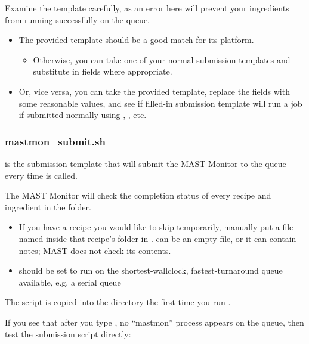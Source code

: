 \documentclass[letterpaper,10pt,english]{sphinxmanual}
\begin{document}
Examine the template carefully, as an error here will prevent your ingredients from running successfully on the queue.
\begin{itemize}
\item {} 
The provided template should be a good match for its platform.
\begin{itemize}
\item {} 
Otherwise, you can take one of your normal submission templates and substitute in  fields where appropriate.

\end{itemize}

\item {} 
Or, vice versa, you can take the provided template, replace the  fields with some reasonable values, and see if filled-in submission template will run a job if submitted normally using , , etc.

\end{itemize}


\subsubsection{mastmon\_submit.sh}
\label{1_0_installation:mastmon-submit-sh}
 is the submission template that will submit the MAST Monitor to the queue every time  is called.

The MAST Monitor will check the completion status of every recipe and ingredient in the  folder.
\begin{itemize}
\item {} 
If you have a recipe you would like to skip temporarily, manually put a file named  inside that recipe's folder in .  can be an empty file, or it can contain notes; MAST does not check its contents.

\item {} 
 should be set to run on the shortest-wallclock, fastest-turnaround queue available, e.g. a serial queue

\end{itemize}

The  script is copied into the  directory the first time you run .

If you see that after you type , no ``mastmon'' process appears on the queue, then test the submission script directly:
\end{document}
